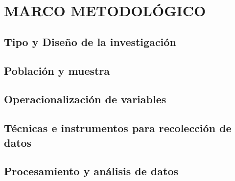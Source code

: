 \chapter{MARCO METODOLÓGICO}
  \section{Tipo y Diseño de la investigación}
  \section{Población y muestra}
  \section{Operacionalización de variables}
  \section{Técnicas e instrumentos para recolección de datos}
  \section{Procesamiento y análisis de datos}